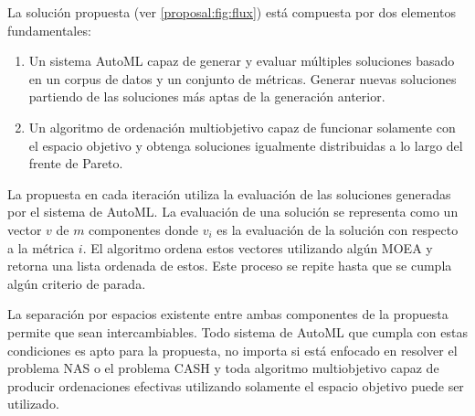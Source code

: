 La soluci\'on propuesta (ver \ref{proposal:fig:flux}) est\'a compuesta por dos elementos fundamentales:
\begin{enumerate}
    \item Un sistema AutoML capaz de generar y evaluar m\'ultiples soluciones basado en un corpus de datos y un conjunto de m\'etricas. Generar nuevas soluciones partiendo de las soluciones m\'as aptas de la generaci\'on anterior.
    \item Un algoritmo de ordenaci\'on multiobjetivo capaz de funcionar solamente con el espacio objetivo y obtenga soluciones igualmente distribuidas a lo largo del frente de Pareto.
\end{enumerate}

La propuesta en cada iteraci\'on utiliza la evaluaci\'on de las soluciones generadas por el sistema de AutoML. La evaluaci\'on de una soluci\'on se representa como un vector $v$ de $m$ componentes donde $v_i$ es la evaluaci\'on de la soluci\'on con respecto a la m\'etrica $i$. El algoritmo ordena estos vectores utilizando alg\'un MOEA y retorna una lista ordenada de estos. Este proceso se repite hasta que se cumpla alg\'un criterio de parada.

La separaci\'on  por espacios existente entre ambas componentes de la propuesta permite que sean intercambiables. Todo sistema de AutoML que cumpla con estas condiciones es apto para la propuesta, no importa si est\'a enfocado en resolver el problema NAS o el problema CASH y toda algoritmo multiobjetivo capaz de producir ordenaciones efectivas utilizando solamente el espacio objetivo puede ser utilizado.


